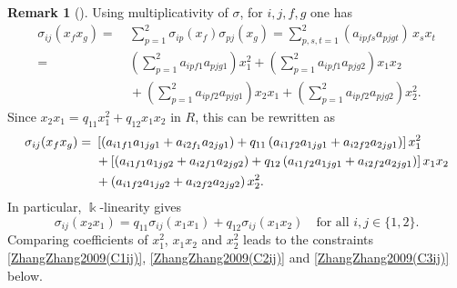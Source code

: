 \documentclass{amsart}
\theoremstyle{definition}
\newtheorem{remark}[theorem]{Remark}
\theoremstyle{remark}
\numberwithin{equation}{section}
\begin{document}
\begin{remark}[{\cite[p. 388--390]{ZhangZhang2009}}]
Using multiplicativity of $\sigma$, for $i,j,f,g$ one has
\begin{align*}
\sigma_{ij}(x_fx_g)
= &\ \sum_{p=1}^{2}\sigma_{ip}(x_f)\sigma_{pj}(x_g)
= \sum_{p,s,t=1}^{2}(a_{ipfs}a_{pjgt})\,x_sx_t\\
= &\ \left(\sum_{p=1}^{2}a_{ipf1}a_{pjg1}\right)x_1^2
+\left(\sum_{p=1}^{2}a_{ipf1}a_{pjg2}\right)x_1x_2\\
&\ +\left(\sum_{p=1}^{2}a_{ipf2}a_{pjg1}\right)x_2x_1
+\left(\sum_{p=1}^{2}a_{ipf2}a_{pjg2}\right)x_2^2.
\end{align*}
Since $x_2x_1=q_{11}x_1^2+q_{12}x_1x_2$ in $R$, this can be rewritten as
\begin{align}
\sigma_{ij}(x_fx_g)=&\ \left[\left( a_{i1f1}a_{1jg1} + a_{i2f_1}a_{2jg1}   \right) + q_{11}\left(a_{i1f2}a_{1jg1} + a_{i2f2}a_{2jg1}\right)\right]x_1^{2} \notag \\
&\ + \left[\left( a_{i1f1}a_{1jg2} + a_{i2f1} a_{2jg2}\right) + q_{12}\left(a_{i1f2} a_{1jg1} + a_{i2f2} a_{2jg1}\right) \right] x_1x_2 \notag \\
&\ + \left(a_{i1f2} a_{1jg2} + a_{i2f2} a_{2jg2}\right)x_2^{2}. \label{ZhangZhang2009(E3.0.3)}
\end{align}
In particular, $\Bbbk$-linearity gives
\begin{equation}\label{ZhangZhang2009(E3.0.4)}
\sigma_{ij}(x_2x_1)=q_{11}\sigma_{ij}(x_1x_1)+q_{12}\sigma_{ij}(x_1x_2)\quad \text{for all }i,j\in\{1,2\}.
\end{equation}
Comparing coefficients of $x_1^2$, $x_1x_2$ and $x_2^2$ leads to the constraints \eqref{ZhangZhang2009(C1ij)}, \eqref{ZhangZhang2009(C2ij)} and \eqref{ZhangZhang2009(C3ij)} below.
\end{remark}
\end{document}
